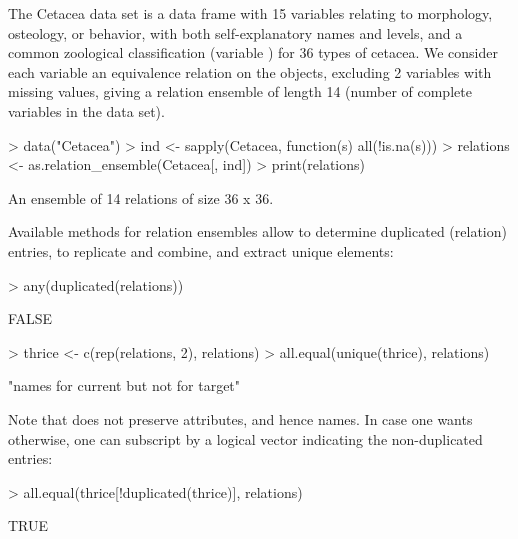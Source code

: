 \documentclass[fleqn]{article}
\newcommand{\codefun}[1]{\code{#1()}}
\begin{document}
The Cetacea data set \citep{relations:Vescia:1985} is a data frame with
15 variables relating to morphology, osteology, or behavior, with both
self-explanatory names and levels, and a common zoological
classification (variable ) for 36 types of cetacea.  We
consider each variable an equivalence relation on the objects, excluding
2 variables with missing values, giving a relation ensemble of length 14
(number of complete variables in the data set).
\begin{Schunk}
\begin{Sinput}
> data("Cetacea")
> ind <- sapply(Cetacea, function(s) all(!is.na(s)))
> relations <- as.relation_ensemble(Cetacea[, ind])
> print(relations)
\end{Sinput}
\begin{Soutput}
An ensemble of 14 relations of size 36 x 36.
\end{Soutput}
\end{Schunk}
Available methods for relation ensembles allow to determine duplicated
(relation) entries, to replicate and combine, and extract unique
elements:
\begin{Schunk}
\begin{Sinput}
> any(duplicated(relations))
\end{Sinput}
\begin{Soutput}
[1] FALSE
\end{Soutput}
\begin{Sinput}
> thrice <- c(rep(relations, 2), relations)
> all.equal(unique(thrice), relations)
\end{Sinput}
\begin{Soutput}
[1] "names for current but not for target"
\end{Soutput}
\end{Schunk}
Note that \codefun{unique} does not preserve attributes, and hence
names.  In case one wants otherwise, one can subscript by a logical
vector indicating the non-duplicated entries:
\begin{Schunk}
\begin{Sinput}
> all.equal(thrice[!duplicated(thrice)], relations)
\end{Sinput}
\begin{Soutput}
[1] TRUE
\end{Soutput}
\end{Schunk}
\end{document}
